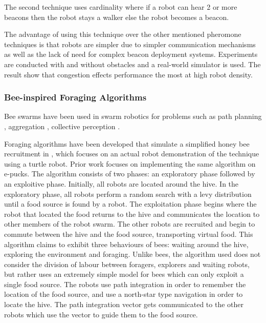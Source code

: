 The second technique uses cardinality where if a robot can hear 2 or more beacons then the robot stays a walker else the robot becomes a beacon. 

The advantage of using this technique over the other mentioned pheromone techniques is that robots are simpler due to simpler communication mechanisms as well as the lack of need for complex beacon deployment systems. Experiments are conducted with and without obstacles and a real-world simulator is used. The result show that congestion effects performance the most at high robot density. %

\subsubsection{Bee-inspired Foraging Algorithms}
Bee swarms have been used in swarm robotics for problems such as path planning \cite{lin2009chaotic}, aggregation \cite{kernbach2009re}, collective perception \cite{schmickl2007collective}.%

Foraging algorithms have been developed that simulate a simplified honey bee recruitment in \cite{alers2014biologically}, which focuses on an actual robot demonstration of the technique using a turtle robot. Prior work focuses on implementing the same algorithm on e-pucks. The algorithm consists of two phases: an exploratory phase followed by an exploitive phase. Initially, all robots are located around the hive. In the exploratory phase, all robots perform a random search with a levy distribution until a food source is found by a robot. The exploitation phase begins where the robot that located the food returns to the hive and communicates the location to other members of the robot swarm. The other robots are recruited and begin to commute between the hive and the food source, transporting virtual food. This algorithm claims to exhibit three behaviours of bees: waiting around the hive, exploring the environment and foraging. Unlike bees, the algorithm used does not consider the division of labour between foragers, explorers and waiting robots, but rather uses an extremely simple model for bees which can only exploit a single food source. The robots use path integration in order to remember the location of the food source, and use a north-star type navigation in order to locate the hive. The path integration vector gets communicated to the other robots which use the vector to guide them to the food source. 

